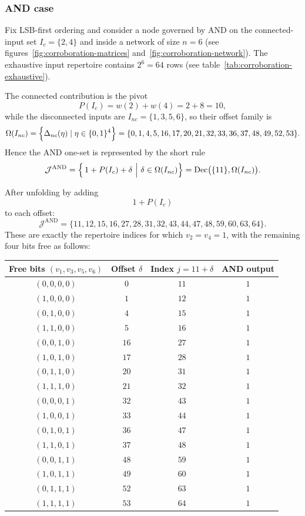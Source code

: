 \documentclass[11pt]{article}
\theoremstyle{definition}
\newcommand{\Ic}{I_c}
\newcommand{\J}{\mathcal{J}}
\newcommand{\bits}{\{0,1\}}
\begin{document}
\subsubsection{AND case}
Fix LSB-first ordering and consider a node governed by AND on the connected-input set \(\Ic=\{2,4\}\) 
 and inside a network of size \(n=6\) (see figures~\ref{fig:corroboration-matrices} and~\ref{fig:corroboration-network}). 
The exhaustive input repertoire contains \(2^6=64\) rows (see table~\ref{tab:corroboration-exhaustive}).

The connected contribution is the pivot
\[
P(\Ic)=w(2)+w(4)=2+8=10,
\]
while the disconnected inputs are \(I_{nc}=\{1,3,5,6\}\), so their offset family is
\[
\Omega(I_{nc})=\Bigl\{\Delta_{nc}(\eta)\mid \eta\in\bits^{4}\Bigr\}
=
\{0,1,4,5,16,17,20,21,32,33,36,37,48,49,52,53\}.
\]
Hence the AND one-set is represented by the short rule
\[
\J^{\mathrm{AND}}
=
\Bigl\{\,1+P(\Ic)+\delta \ \Big| \ \delta\in\Omega(I_{nc})\Bigr\}
=
\operatorname{Dec}\bigl(\{11\},\Omega(I_{nc})\bigr).
\]

After unfolding by adding \[1+P(\Ic)\] to each offset:
\[
\J^{\mathrm{AND}}=\{11,12,15,16,27,28,31,32,43,44,47,48,59,60,63,64\}.
\]
These are exactly the repertoire indices for which \(v_2=v_4=1\), with the remaining four bits free as follows:

\begin{center}
\small
\begin{tabular}{cccc}
\toprule
Free bits \((v_1,v_3,v_5,v_6)\) & Offset \(\delta\) & Index \(j=11+\delta\) & AND output \\
\midrule
\((0,0,0,0)\) & \(0\)  & \(11\) & \(1\) \\
\((1,0,0,0)\) & \(1\)  & \(12\) & \(1\) \\
\((0,1,0,0)\) & \(4\)  & \(15\) & \(1\) \\
\((1,1,0,0)\) & \(5\)  & \(16\) & \(1\) \\
\((0,0,1,0)\) & \(16\) & \(27\) & \(1\) \\
\((1,0,1,0)\) & \(17\) & \(28\) & \(1\) \\
\((0,1,1,0)\) & \(20\) & \(31\) & \(1\) \\
\((1,1,1,0)\) & \(21\) & \(32\) & \(1\) \\
\((0,0,0,1)\) & \(32\) & \(43\) & \(1\) \\
\((1,0,0,1)\) & \(33\) & \(44\) & \(1\) \\
\((0,1,0,1)\) & \(36\) & \(47\) & \(1\) \\
\((1,1,0,1)\) & \(37\) & \(48\) & \(1\) \\
\((0,0,1,1)\) & \(48\) & \(59\) & \(1\) \\
\((1,0,1,1)\) & \(49\) & \(60\) & \(1\) \\
\((0,1,1,1)\) & \(52\) & \(63\) & \(1\) \\
\((1,1,1,1)\) & \(53\) & \(64\) & \(1\) \\
\bottomrule
\end{tabular}
\end{center}
\end{document}

